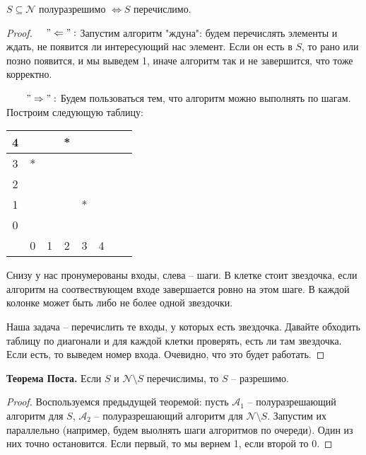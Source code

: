 \begin{theorem}
    $S \subseteq \mathcal{N}$ полуразрешимо $\Longleftrightarrow S$ перечислимо. 
\end{theorem}
\begin{proof}
    \quad 

    \quad $\quad"\Leftarrow":$ Запустим алгоритм "ждуна": будем перечислять элементы и ждать, не появится ли интересующий нас элемент. Если он есть в $S$, то рано или позно появится, и мы выведем 1, иначе алгоритм так и не завершится, что тоже корректно.
    
    $\quad\quad "\Rightarrow":$ Будем пользоваться тем, что алгоритм можно выполнять по шагам. Построим следующую таблицу:
    \begin{center}
        \begin{tabular}{|c|| c | c | c| c | c | c | c |} 
         \hline
        4 &  &  & * & & \\ 
         \hline
        3 & * &  & & &  \\
         \hline
         2 &  &  & & &  \\
         \hline
         1 &  &  & & * &  \\
         \hline
         0 &  &  & & &  \\
         \hline\hline
          & 0  & 1  & 2 & 3 & 4 \\
         \hline
        \end{tabular}
    \end{center}
    \quad Снизу у нас пронумерованы входы, слева -- шаги. В клетке стоит звездочка, если алгоритм на соотвествующем входе завершается ровно на этом шаге. В каждой колонке может быть либо не более одной звездочки. 
    
    \quad Наша задача -- перечислить те входы, у которых есть звездочка. Давайте обходить таблицу по диагонали и для каждой клетки проверять, есть ли там звездочка. Если есть, то выведем номер входа. Очевидно, что это будет работать.
\end{proof}

\textbf{Теорема Поста.} Если $S$ и $\mathcal{N} \setminus S$ перечислимы, то $S$ -- разрешимо.

\begin{proof}
    Воспользуемся предыдущей теоремой: пусть $\mathcal{A}_1$ -- полуразрешающий алгоритм для $S$, $\mathcal{A}_2$ -- полуразрешающий алгоритм для $\mathcal{N} \setminus S$. Запустим их параллельно (например, будем выолнять шаги алгоритмов по очереди). Один из них точно остановится. Если первый, то мы вернем 1, если второй то 0.
\end{proof}

